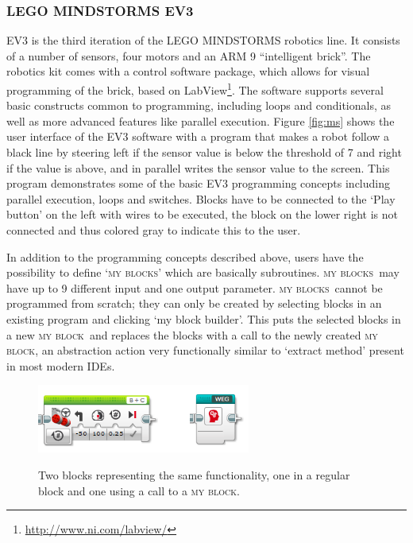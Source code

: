 \documentclass[conference]{IEEEtran}
\newcommand{\ms}{LEGO MINDSTORMS EV3}
\newcommand{\mbs}{\textsc{my blocks}}
\newcommand{\mb}{\textsc{my block}}
\begin{document}
\subsubsection{\ms}
\label{sec:lego}
EV3 is the third iteration of the LEGO MINDSTORMS robotics line. It consists of a number of sensors, four motors and an ARM 9 ``intelligent brick''. The robotics kit comes with a control software package, which allows for visual programming of the brick, based on LabView\footnote{\url{http://www.ni.com/labview/}}. The software supports several basic constructs common to programming, including loops and conditionals, as well as more advanced features like parallel execution. Figure \ref{fig:ms} shows the user interface of the EV3 software with a program that makes a robot follow a black line by steering left if the sensor value is below the threshold of 7 and right if the value is above, and in parallel writes the sensor value to the screen. This program demonstrates some of the basic EV3 programming concepts including parallel execution, loops and switches. Blocks have to be connected to the `Play button' on the left with wires to be executed, the block on the lower right is not connected and thus colored gray to indicate this to the user.

In addition to the programming concepts described above, users have the possibility to define `\mbs' which are basically  subroutines. \mbs~may have up to 9 different input and one output parameter. \mbs~cannot be programmed from scratch; they can only be created by selecting blocks in an existing program and clicking `my block builder'. This puts the selected blocks in a new \mb~and replaces the blocks with a call to the newly created \mb, an abstraction action very functionally similar to `extract method' present in most modern IDEs. 

\begin{figure} [tb]
\caption{Two blocks representing the same functionality, one in a regular block and one using a call to a \mb.}
\centering
\includegraphics[width=7cm]{img/weg}
\label{fig:weg}
\end{figure}
\end{document}
